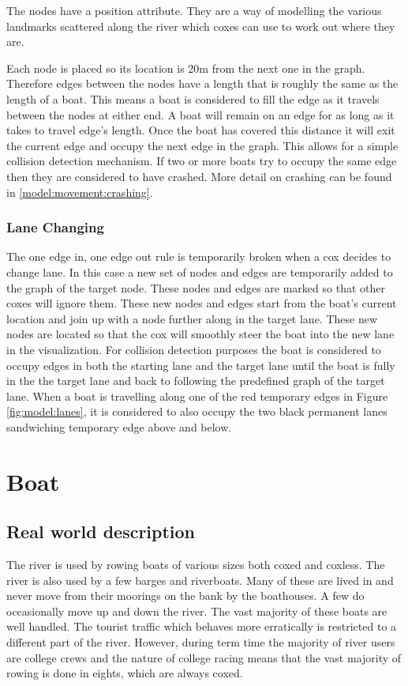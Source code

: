       The nodes have a position attribute. They are a way of modelling the various landmarks scattered along the river which coxes can use to work out where they are.
      
      Each node is placed so its location is 20m from the next one in the graph. Therefore edges between the nodes have a length that is roughly the same as the length of a boat. This means a boat is considered to fill the edge as it travels between the nodes at either end. A boat will remain on an edge for as long as it takes to travel edge's length. Once the boat has covered this distance it will exit the current edge and occupy the next edge in the graph. This allows for a simple collision detection mechanism. If two or more boats try to occupy the same edge then they are considered to have crashed. More detail on crashing can be found in \ref{model:movement:crashing}.
      
      \subsubsection{Lane Changing} \label{model:river:lane_changing}
      The one edge in, one edge out rule is temporarily broken when a cox decides to change lane. In this case a new set of nodes and edges are temporarily added to the graph of the target node. These nodes and edges are marked so that other coxes will ignore them. These new nodes and edges start from the boat's current location and join up with a node further along in the target lane. These new nodes are located so that the cox will smoothly steer the boat into the new lane in the visualization. For collision detection purposes the boat is considered to occupy edges in both the starting lane and the target lane until the boat is fully in the the target lane and back to following the predefined graph of the target lane. When a boat is travelling along one of the red temporary edges in Figure \ref{fig:model:lanes}, it is considered to also occupy the two black permanent lanes sandwiching temporary edge above and below.

    \section{Boat}
      \subsection{Real world description}
      The river is used by rowing boats of various sizes both coxed and coxless. The river is also used by a few barges and riverboats. Many of these are lived in and never move from their moorings on the bank by the boathouses. A few do occasionally move up and down the river. The vast majority of these boats are well handled. The tourist traffic which behaves more erratically is restricted to a different part of the river. However, during term time the majority of river users are college crews and the nature of college racing means that the vast majority of rowing is done in eights, which are always coxed.
      

